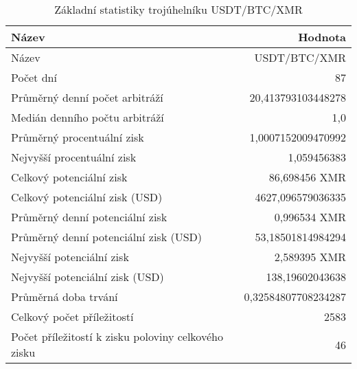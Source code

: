 \begin{table}\centering
\caption{Základní statistiky trojúhelníku USDT/BTC/XMR}
\label{USDTBTCXMR_stats}
\begin{tabular}{|| l | r ||}
\hline Název & Hodnota \\ 
\hline\hline Název & USDT/BTC/XMR \\ 
\hline Počet dní & 87 \\ 
\hline Průměrný denní počet arbitráží & 20,413793103448278 \\ 
\hline Medián denního počtu arbitráží & 1,0 \\ 
\hline Průměrný procentuální zisk & 1,0007152009470992 \\ 
\hline Nejvyšší procentuální zisk & 1,059456383 \\ 
\hline Celkový potenciální zisk & 86,698456 XMR \\ 
\hline Celkový potenciální zisk (USD) & 4627,096579036335 \\ 
\hline Průměrný denní potenciální zisk & 0,996534 XMR \\ 
\hline Průměrný denní potenciální zisk (USD) & 53,18501814984294 \\ 
\hline Nejvyšší potenciální zisk & 2,589395 XMR \\ 
\hline Nejvyšší potenciální zisk (USD) & 138,19602043638 \\ 
\hline Průměrná doba trvání & 0,32584807708234287 \\ 
\hline Celkový počet příležitostí & 2583 \\ 
\hline Počet příležitostí k zisku poloviny celkového zisku & 46 \\ 
\hline
\end{tabular}
\end{table}